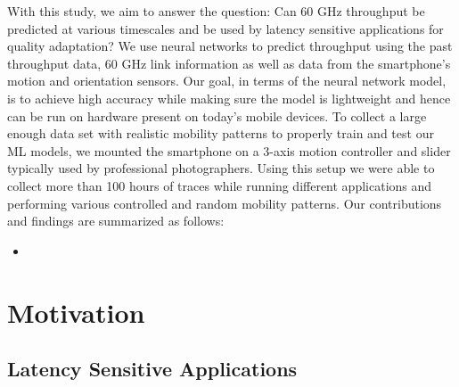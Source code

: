 \documentclass[sigconf,anonymous]{acmart}
\begin{document}
With this study, we aim to answer the question: Can 60 GHz throughput be predicted at various timescales and be used by latency sensitive applications for quality adaptation? We use neural networks to predict throughput using the past throughput data, 60 GHz link information as well as data from the smartphone's motion and orientation sensors. Our goal, in terms of the neural network model, is to achieve high accuracy while making sure the model is lightweight and hence can be run on hardware present on today's mobile devices. To collect a large enough data set with realistic mobility patterns to properly train and test our ML models, we mounted the smartphone on a 3-axis motion controller and slider typically used by professional photographers. Using this setup we were able to collect more than 100 hours of traces while running different applications and performing various controlled and random mobility patterns. 
\fi
Our contributions and findings are summarized as follows:

\begin{itemize}
    \item 
\end{itemize}

\section{Motivation} %

\subsection{Latency Sensitive Applications}
\end{document}

